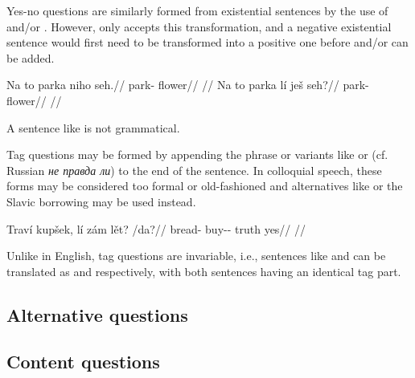 Yes-no questions are similarly formed from existential sentences by the use of
 and/or . However, only  accepts this transformation,
and a negative existential sentence would first need to be transformed into a
positive one before  and/or  can be added.

\pex
\a \begingl
  \gla Na to parka niho seh.//
  \glb \Loc{} \Dem{} park-\Acc{} \N{}\Exst{} flower//
  \glft {}//
  \endgl
\a \begingl
  \gla Na to parka lí ješ seh?//
  \glb \Loc{} \Dem{} park-\Acc{} \Q{} \Exst{} flower//
  \glft {}//
  \endgl
\xe

A sentence like  is not grammatical.

Tag questions may be formed by appending the phrase  or variants like  or 
(cf. Russian \textit{\cyrtext не правда ли}) to the end of the
sentence. In colloquial speech, these forms may be considered too formal or
old-fashioned and alternatives like  
 or the Slavic borrowing  may be used
instead.

\pex
\begingl
\gla Traví kupšek, lí zám lět? /da?//
\glb bread-\Gen{} buy-\Av{}-\Pf{} \Q{} \Neg{} truth yes//
\glft {}//
\endgl
\xe

Unlike in English, tag questions are invariable, i.e., sentences like
 and  can be translated as  and  respectively, with both sentences having an identical tag part.

\subsection{Alternative questions}\label{sec:alternative-questions}

\subsection{Content questions}\label{sec:content-questions}

